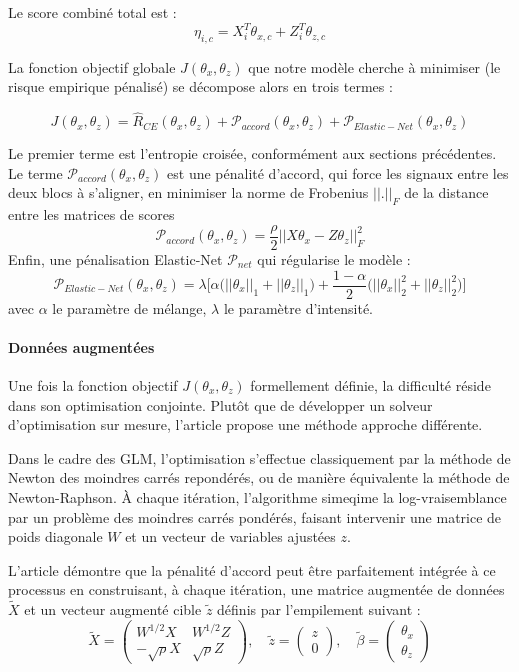\documentclass[a4paper,11pt]{paper}
\theoremstyle{plain}
\theoremstyle{definition}
\theoremstyle{remark}
\begin{document}
Le score combiné total est :
$$\eta_{i,c} = X_i^T \theta_{x,c} + Z_i^T \theta_{z,c}$$

La fonction objectif globale $J(\theta_x, \theta_z)$ que notre modèle cherche à minimiser (le risque empirique pénalisé) se décompose alors en trois termes :

$$J(\theta_x, \theta_z) = \hat{R}_{CE}(\theta_x, \theta_z) + \mathcal{P}_{accord}(\theta_x, \theta_z) + \mathcal{P}_{Elastic-Net}(\theta_x, \theta_z)$$

Le premier terme est l'entropie croisée, conformément aux sections précédentes. \\
Le terme $\mathcal P_{accord}(\theta_x, \theta_z)$ est une pénalité d'accord, qui force les signaux entre les deux blocs à s'aligner, en minimiser la norme de Frobenius $||.||_F$ de la distance entre les matrices de scores
$$\mathcal P_{accord}(\theta_x, \theta_z) = \dfrac{\rho}{2}||X\theta_x - Z\theta_z||_F^2$$
Enfin, une pénalisation Elastic-Net $\mathcal P_{net}$ qui régularise le modèle :
$$\mathcal{P}_{Elastic-Net}(\theta_x, \theta_z) = \lambda \bigg[ \alpha \big(||\theta_x||_1 + ||\theta_z||_1\big) + \frac{1 - \alpha}{2} \big(||\theta_x||_2^2 + ||\theta_z||_2^2\big) \bigg]$$
avec $\alpha$ le paramètre de mélange, $\lambda$ le paramètre d'intensité.

\paragraph{Données augmentées}

Une fois la fonction objectif $J(\theta_x, \theta_z)$ formellement définie, la difficulté réside dans son optimisation conjointe. Plutôt que de développer un solveur d'optimisation sur mesure, l'article propose une méthode approche différente.

Dans le cadre des GLM, l'optimisation s'effectue classiquement par la méthode de Newton des moindres carrés repondérés, ou de manière équivalente la méthode de Newton-Raphson. À chaque itération, l'algorithme simeqime la log-vraisemblance par un problème des moindres carrés pondérés, faisant intervenir une matrice de poids diagonale $W$ et un vecteur de variables ajustées $z$.

L'article démontre que la pénalité d'accord peut être parfaitement intégrée à ce processus en construisant, à chaque itération, une matrice augmentée de données $\tilde{X}$ et un vecteur augmenté cible $\tilde{z}$ définis par l'empilement suivant :
$$\tilde{X} = \begin{pmatrix} W^{1/2}X & W^{1/2}Z \\ -\sqrt{\rho}X & \sqrt{\rho}Z \end{pmatrix}, \quad \tilde{z} = \begin{pmatrix} z \\ 0 \end{pmatrix}, \quad \tilde{\beta} = \begin{pmatrix} \theta_x \\ \theta_z \end{pmatrix}$$
\end{document}
